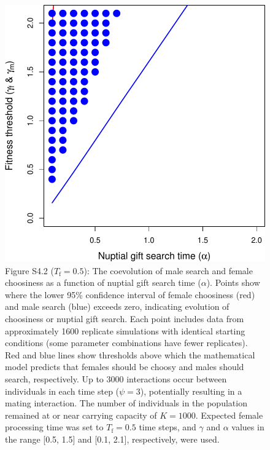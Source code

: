 \documentclass[
]{article}
\begin{document}
\captionsetup{labelformat=default}

\clearpage

\captionsetup{labelformat=empty}

\begin{figure}
\centering
\includegraphics{ms_refs_fixed_files/figure-latex/unnamed-chunk-7-1.pdf}
\caption{Figure S4.2 (\(T_{\mathrm{f}} = 0.5\)): The coevolution of male
search and female choosiness as a function of nuptial gift search time
(\(\alpha\)). Points show where the lower 95\% confidence interval of
female choosiness (red) and male search (blue) exceeds zero, indicating
evolution of choosiness or nuptial gift search. Each point includes data
from approximately 1600 replicate simulations with identical starting
conditions (some parameter combinations have fewer replicates). Red and
blue lines show thresholds above which the mathematical model predicts
that females should be choosy and males should search, respectively. Up
to 3000 interactions occur between individuals in each time step
(\(\psi = 3\)), potentially resulting in a mating interaction. The
number of individuals in the population remained at or near carrying
capacity of \(K = 1000\). Expected female processing time was set to
\(T_{\mathrm{f}}=0.5\) time steps, and \(\gamma\) and \(\alpha\) values
in the range {[}0.5, 1.5{]} and {[}0.1, 2.1{]}, respectively, were
used.}
\end{figure}
\end{document}
